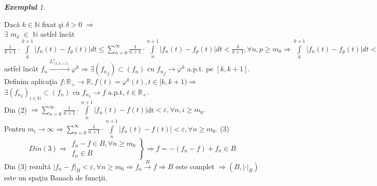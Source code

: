 \documentclass[ a4paper, 12pt]{report}
\theoremstyle{remark}
\newtheorem{exemple}{\bf Exemplul}[section]
\numberwithin{equation}{section}
\begin{document}
\begin{exemple}
\begin{enumerate}
Dac\u a $k \in \mathbb{N}$ fixat \c si $\delta>0$ $\Rightarrow$ \\ $\exists$  $m_\delta$ $\in$ $\mathbb{N}$ astfel \^inc\^ at $\frac{1}{k+1}\cdot\int\limits_{k}^{k+1}{\lvert f_n {(t)} - f_p{(t)} \rvert dt}
\leq\sum\limits_{n=0}^{\infty}\frac{1}{n+1}\cdot\int\limits_{n}^{n+1}\lvert f_n{(t)}-f_p{(t)}\rvert dt < \frac{\delta}{k+1}, \forall n,p \geq m_0 \Rightarrow \int\limits_{k}^{k+1}\lvert f_n({t})-f_p({t})\rvert dt<\delta,\forall n,p\geq m_\delta\Rightarrow(f_n)_n \in \mathcal{F}_L{^1_{[k,k+1]}} \Rightarrow \exists   \varphi^k \in L^1_{[k,k+1]}$ astfel \^inc\^ at $f_n\xrightarrow{L^1_{[k,k+1]}} \varphi^k \Rightarrow \exists ({f_n}_j)\subset (f_n)$ cu ${f_n}_j\xrightarrow{}\varphi^k$ a.p.t. pe $[k,k+1]$.\vspace{2mm}
\vspace{2mm}\\
Definim aplica\c tia $f:{\mathbb{R}}_+ \xrightarrow{}  \mathbb{R} , f(t)={ \varphi^k}(t) , t \in[k,k+1) \Rightarrow$ \\  $\exists {({f_n}_i)}_{i \in \mathbb{N}} \subset (f_n)$ cu ${f_n}_i\xrightarrow{}f$ a.p.t, $t \in \mathbb{R}_+.$\\
Din (2) $\Rightarrow \sum\limits_{n=0}^{\infty}\frac{1}{n+1}\cdot \int\limits_{n}^{n+1}\lvert f_n(t)-f(t)\rvert$dt$<\varepsilon,\forall n,i\geq m_0.$
\\Pentru $m_i\xrightarrow{}\infty\Rightarrow \sum\limits_{n=0}^{\infty}\frac{1}{n+1}\cdot \int\limits_{n}^{n+1}
\lvert f_n(t)-f(t) \rvert<\varepsilon,\forall n\geq m_0$.\hspace{18mm} (3) \\
\begin{equation*}
 Din(3) \Rightarrow
  \left.\begin{aligned}
          f_n-f\in B,\forall n\geq m_0 \\
         f_n\in B
        \end{aligned}
  \right\}
  \mbox{$\Rightarrow f=-(f_n-f)+f_n\in B$}
 \end{equation*}
Din (3) rezult\u a $\lvert f_n-f\rvert_B<\varepsilon,\forall n\geq m_0\Rightarrow f_n\xrightarrow{B}f \Rightarrow B$ este complet $\Rightarrow(B,\lvert \cdot \rvert_B)$este un spa\c tiu Banach de func\c tii.


\end{enumerate}
\end{exemple}
\end{document}
